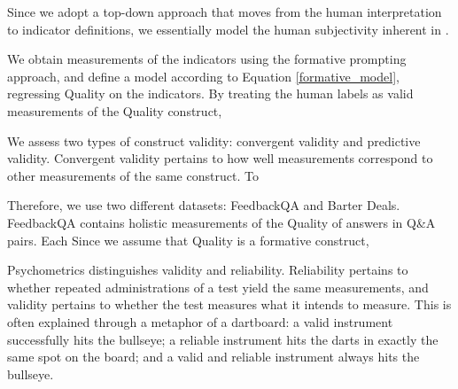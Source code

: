 


\newpage

Since we adopt a top-down approach that moves from the human interpretation to indicator definitions, we essentially model the human subjectivity inherent in .

We obtain measurements of the indicators using the formative prompting approach, and define a model according to Equation \ref{formative_model}, regressing Quality on the indicators. By treating the human labels as valid measurements of the Quality construct, 










 We assess two types of construct validity: convergent validity and predictive validity. Convergent validity pertains to how well measurements correspond to other measurements of the same construct. To  

Therefore, we use two different datasets: FeedbackQA and Barter Deals. FeedbackQA contains holistic measurements of the Quality of answers in Q\&A pairs. Each  Since we assume that Quality is a formative construct, 


\newpage

Psychometrics distinguishes validity and reliability. Reliability pertains to whether repeated administrations of a test yield the same measurements, and validity pertains to whether the test measures what it intends to measure. This is often explained through a metaphor of a dartboard: a valid instrument successfully hits the bullseye; a reliable instrument hits the darts in exactly the same spot on the board; and a valid and reliable instrument always hits the bullseye. 

